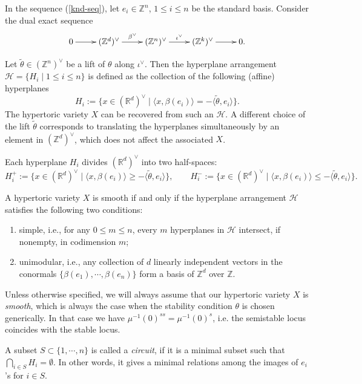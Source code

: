 \documentclass[10pt]{amsart}
\theoremstyle{definition}
\def\ZZ{{\mathbb{Z}}}
\def\RR{{\mathbb{R}}}
\newcommand{\cH}{\mathcal{H}}
\theoremstyle{definition}
\numberwithin{equation}{section}
\theoremstyle{Theorem}
\begin{document}
In the sequence (\ref{knd-seq}), let $e_i\in \ZZ^n$, $1\leq i\leq n$ be the standard basis. Consider the dual exact sequence
$$
\xymatrix{
	0 \ar[r] & (\ZZ^d)^\vee \ar[r]^{\beta^\vee} & (\ZZ^n)^\vee \ar[r]^{\iota^\vee} & (\ZZ^k)^\vee \ar[r] & 0.
}
$$

Let $\widetilde\theta \in (\ZZ^n)^\vee$ be a lift of $\theta$ along $\iota^\vee$. Then the hyperplane arrangement $\cH = \{ H_i \mid 1\leq i \leq n\}$ is defined as the collection of the following (affine) hyperplanes
$$
H_i := \{x\in (\RR^d)^\vee \mid \langle x, \beta (e_i) \rangle = - \langle \widetilde\theta, e_i \rangle \}.
$$
The hypertoric variety $X$ can be recovered from such an $\cH$. A different choice of the lift $\widetilde\theta$ corresponds to translating the hyperplanes simultaneously by an element in $(\ZZ^d)^\vee$, which does not affect the associated $X$.

Each hyperplane $H_i$ divides $(\RR^d)^\vee$ into two half-spaces:
$$
H_i^+ := \{x\in (\RR^d)^\vee \mid \langle x, \beta (e_i) \rangle \geq - \langle \widetilde\theta, e_i \rangle \}, \qquad H_i^- := \{x\in (\RR^d)^\vee \mid \langle x, \beta (e_i) \rangle \leq - \langle \widetilde\theta, e_i \rangle \}.
$$

A hypertoric variety $X$ is smooth if and only if the hyperplane arrangement $\cH$ satisfies the following two conditions:

\begin{enumerate}[1)]
	
	\item simple, i.e., for any $0\leq m \leq n$, every $m$ hyperplanes in $\cH$ intersect, if nonempty, in codimension $m$;
	
	\item unimodular, i.e., any collection of $d$ linearly independent vectors in the conormals $\{\beta (e_1), \cdots, \beta (e_n) \}$ form a basis of $\ZZ^d$ over $\ZZ$.
	
\end{enumerate}
Unless otherwise specified, we will always assume that our hypertoric variety $X$ is \emph{smooth}, which is always the case when the stability condition $\theta$ is chosen generically.
In that case we have $\mu^{-1} (0)^{ss} = \mu^{-1}(0)^s$, i.e. the semistable locus coincides with the stable locus.

A subset $S \subset \{1, \cdots, n\}$ is called a \emph{circuit}, if it is a minimal subset such that $\bigcap_{i\in S} H_i = \emptyset$. In other words, it gives a minimal relations among the images of $e_i$'s for $i\in S$.
\end{document}
